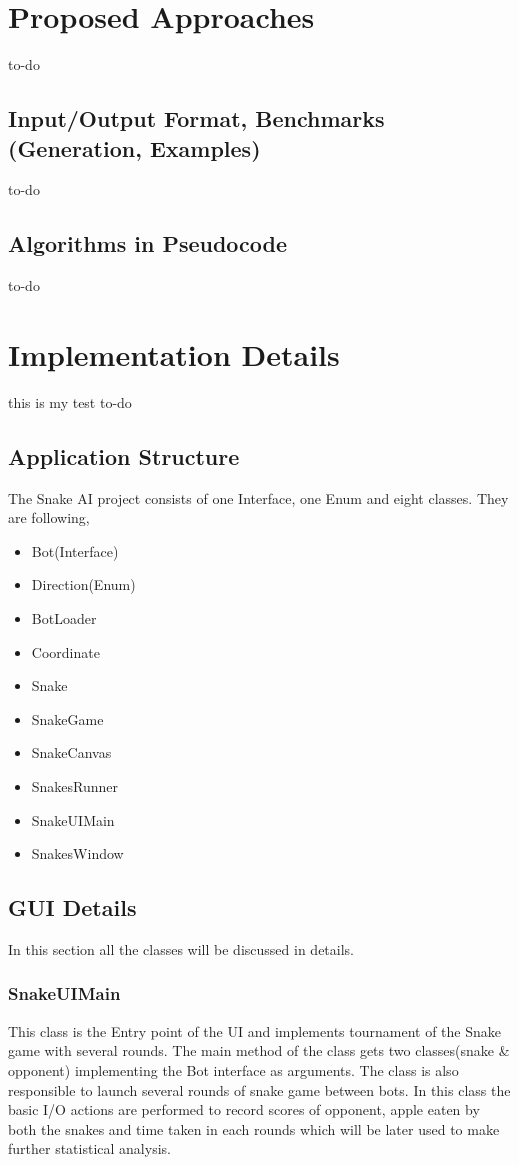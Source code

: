 \documentclass[a4paper,12pt]{article}
\begin{document}
\section{Proposed Approaches}
to-do
\subsection{Input/Output Format, Benchmarks (Generation, Examples)}
to-do
\subsection{Algorithms in Pseudocode}
to-do

\section{Implementation Details}
 this is my test
to-do
\subsection{Application Structure}
The Snake AI project consists of one Interface, one Enum and eight classes. They are following, 

\begin{itemize}
\item Bot(Interface)
\item Direction(Enum)
\item BotLoader
\item Coordinate
\item Snake
\item SnakeGame
\item SnakeCanvas
\item SnakesRunner
\item SnakeUIMain
\item SnakesWindow
\end{itemize}

\subsection{GUI Details}
In this section all the classes will be discussed in details. 
\subsubsection{SnakeUIMain}
This class is the Entry point of the UI and implements tournament of the Snake game with several rounds. The main method of the class gets two classes(snake \& opponent) implementing the Bot interface as arguments. The class is also responsible to launch several rounds of snake game between bots. In this class the basic I/O actions are performed to record scores of opponent, apple eaten by both the snakes and time taken in each rounds which will be later used to make further statistical analysis.
\end{document}
